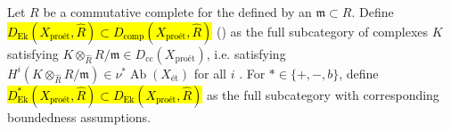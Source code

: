 \begin{definition} \label{definition:pro_etale_analogue_of_ekedahls_adic_category_on_schemes}
    Let $R$ be a commutative  complete for the  defined by an  $\mathfrak{m} \subset R$. 
    Define \hl{$D_{\text{Ek}}(X_{\text{pro\'et}}, \widehat{R}) \subset D_{\text{comp}}(X_{\text{pro\'et}}, \widehat{R})$} ()  as the full subcategory of complexes $K$ satisfying $K \otimes_{\widehat{R}} R/\mathfrak{m} \in D_{\text{cc}}(X_{\text{pro\'et}})$, i.e. satisfying $H^i(K \otimes_{\widehat{R}} R/\mathfrak{m}) \in \nu^* \operatorname{Ab}(X_{\text{\'et}})$ for all $i$ . 
    For $* \in \{+,-,b\}$, define \hl{$D_{\text{Ek}}^*(X_{\text{pro\'et}}, \widehat{R}) \subset D_{\text{Ek}}(X_{\text{pro\'et}}, \widehat{R})$} as the full subcategory with corresponding boundedness assumptions.
\end{definition}